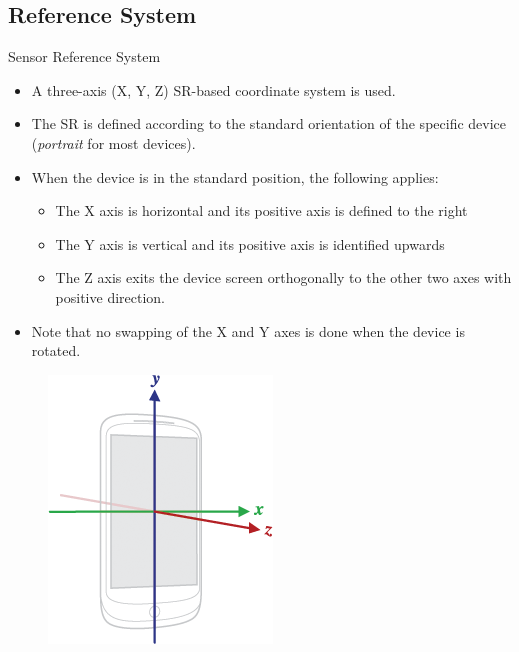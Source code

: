 \documentclass{beamer}
\begin{document}
\subsection{Reference System}
  \begin{frame}[allowframebreaks]{Sensor Reference System}
    \begin{itemize}\itemsep10pt
      \item A three-axis (X, Y, Z) SR-based coordinate system is used.
      \item The SR is defined according to the standard orientation of the
      specific device (\textit{portrait} for most devices).
      \item When the device is in the standard position, the following applies:
      \begin{itemize}
        \item The X axis is horizontal and its positive axis is defined to the
        right
        \item The Y axis is vertical and its positive axis is identified upwards
        \item The Z axis exits the device screen orthogonally to the other two
        axes with positive direction.
      \end{itemize}
      \item Note that no swapping of the X and Y axes is done when the device is
      rotated. 
    \end{itemize}

    \begin{figure}
      \includegraphics[width=0.5\linewidth]{figures/axis_device.png}
    \end{figure}


\end{frame}
\end{document}
